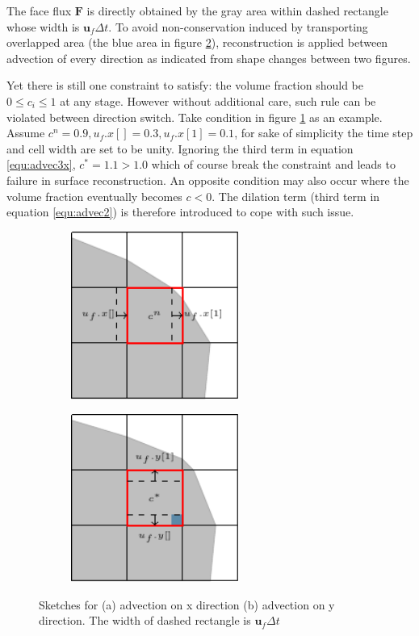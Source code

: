 \documentclass[a4paper]{article}
\begin{document}
The face flux $\mathbf{F}$ is directly obtained by the gray area within dashed rectangle whose width is $\mathbf{u}_f\Delta t$. To avoid non-conservation induced by transporting overlapped area (the blue area in figure \ref{fig:VOFadvectiony}), reconstruction is applied between advection of every direction as indicated from shape changes between two figures.\par
Yet there is still one constraint to satisfy: the volume fraction should be $0\leq c_i \leq1$ at any stage. However without additional care, such rule can be violated between direction switch. Take condition in figure \ref{fig:VOFadvectionx} as an example. Assume $c^n=0.9,u_f.x[]=0.3,u_f.x[1]=0.1$, for sake of simplicity the time step and cell width are set to be unity. Ignoring the third term in equation \ref{equ:advec3x}, $c^\ast = 1.1 > 1.0$ which of course break the constraint and leads to failure in surface reconstruction. An opposite condition may also occur where the volume fraction eventually becomes $c<0$.
The dilation term (third term in equation \ref{equ:advec2}) is therefore introduced to cope with such issue\cite{2003_Scardovelli}.\par
\begin{figure}[!htbp]
    \centering
    \begin{subfigure}[b]{0.45\textwidth}
        \centering
        \includegraphics[height=5.5cm]{image/VOFadvectionx.pdf}
        \subcaption{}
        \label{fig:VOFadvectionx}
    \end{subfigure}
    \begin{subfigure}[b]{0.45\textwidth}
        \centering
        \includegraphics[height=5.5cm]{image/VOFadvectiony.pdf}
        \subcaption{}
        \label{fig:VOFadvectiony}
    \end{subfigure}
    \caption{Sketches for (a) advection on x direction (b) advection on y direction. The width of dashed rectangle is $\mathbf{u}_f\Delta t$}
    \label{fig:VOFadvection}
\end{figure}
\end{document}
